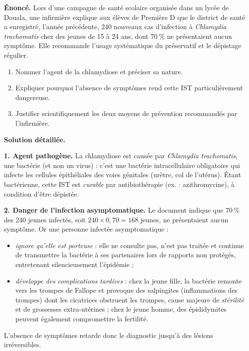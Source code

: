 \documentclass[11pt]{article}
\newcommand{\cle}[1]{{\popxbold\color{popdark}#1}}
\begin{document}
\begin{exoresolu}
\textbf{Énoncé.} Lors d'une campagne de santé scolaire organisée dans un lycée de Douala, une infirmière explique aux élèves de Première D que le district de santé a enregistré, l'année précédente, 240 nouveaux cas d'infection à \emph{Chlamydia trachomatis} chez des jeunes de 15 à 24 ans, dont $70\ \%$ ne présentaient aucun symptôme. Elle recommande l'usage systématique du préservatif et le dépistage régulier.
\begin{enumerate}
\item Nommer l'agent de la chlamydiose et préciser sa nature.
\item Expliquer pourquoi l'absence de symptômes rend cette IST particulièrement dangereuse.
\item Justifier scientifiquement les deux moyens de prévention recommandés par l'infirmière.
\end{enumerate}
\tcblower
\textbf{Solution détaillée.}

\textbf{1. Agent pathogène.} La chlamydiose est causée par \emph{Chlamydia trachomatis}, une \cle{bactérie} (et non un virus) : c'est une bactérie intracellulaire obligatoire qui infecte les cellules épithéliales des voies génitales (urètre, col de l'utérus). Étant bactérienne, cette IST est \emph{curable} par antibiothérapie (ex. : azithromycine), à condition d'être dépistée.

\textbf{2. Danger de l'infection asymptomatique.} Le document indique que $70\ \%$ des 240 jeunes infectés, soit $240 \times 0{,}70 = 168$ jeunes, ne présentaient aucun symptôme. Or une personne infectée asymptomatique :
\begin{itemize}
\item \emph{ignore qu'elle est porteuse} : elle ne consulte pas, n'est pas traitée et continue de transmettre la bactérie à ses partenaires lors de rapports non protégés, entretenant silencieusement l'épidémie ;
\item \emph{développe des complications tardives} : chez la jeune fille, la bactérie remonte vers les trompes de Fallope et provoque des \cle{salpingites} (inflammations des trompes) dont les cicatrices obstruent les trompes, cause majeure de \emph{stérilité} et de grossesses extra-utérines ; chez le jeune homme, des épididymites peuvent également compromettre la fertilité.
\end{itemize}
L'absence de symptômes retarde donc le diagnostic jusqu'à des lésions irréversibles.


\end{exoresolu}
\end{document}
